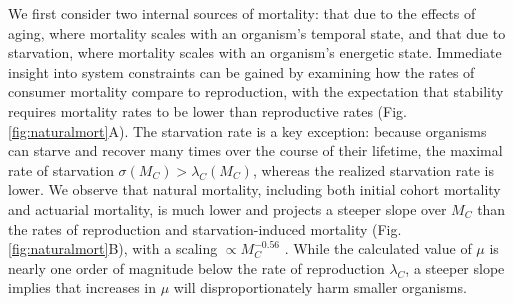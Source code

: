 \documentclass[]{rsos}%
\begin{document}
We first consider two internal sources of mortality: that due to the effects of aging, where mortality scales with an organism's temporal state, and that due to starvation, where mortality scales with an organism's energetic state.
Immediate insight into system constraints can be gained by examining how the rates of consumer mortality compare to reproduction, with the expectation that stability requires mortality rates to be lower than reproductive rates (Fig. \ref{fig:naturalmort}A).
The starvation rate is a key exception: because organisms can starve and recover many times over the course of their lifetime, the maximal rate of starvation $\sigma(M_C) > \lambda_C(M_C)$, whereas the realized starvation rate is lower.
We observe that natural mortality, including both initial cohort mortality and actuarial mortality, is much lower and projects a steeper slope over $M_C$ than the rates of reproduction and starvation-induced mortality (Fig. \ref{fig:naturalmort}B), with a scaling $\propto M_C^{-0.56}$ \cite[cf.][]{jones2008senescence}.
While the calculated value of $\mu$ is nearly one order of magnitude below the rate of reproduction $\lambda_C$, a steeper slope implies that increases in $\mu$ will disproportionately harm smaller organisms. 
\end{document}
